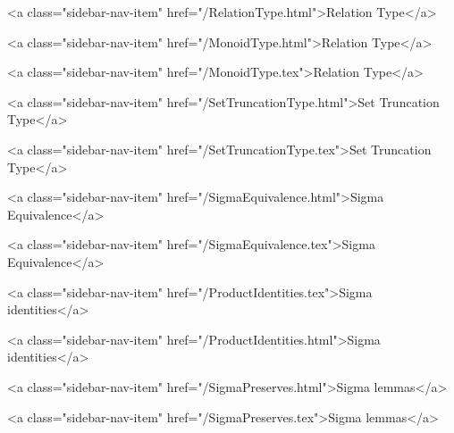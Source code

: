       
    
      
        
          <a class="sidebar-nav-item" href="/RelationType.html">Relation Type</a>
        
      
    
      
        
          <a class="sidebar-nav-item" href="/MonoidType.html">Relation Type</a>
        
      
    
      
        
          <a class="sidebar-nav-item" href="/MonoidType.tex">Relation Type</a>
        
      
    
      
        
          <a class="sidebar-nav-item" href="/SetTruncationType.html">Set Truncation Type</a>
        
      
    
      
        
          <a class="sidebar-nav-item" href="/SetTruncationType.tex">Set Truncation Type</a>
        
      
    
      
        
          <a class="sidebar-nav-item" href="/SigmaEquivalence.html">Sigma Equivalence</a>
        
      
    
      
        
          <a class="sidebar-nav-item" href="/SigmaEquivalence.tex">Sigma Equivalence</a>
        
      
    
      
        
          <a class="sidebar-nav-item" href="/ProductIdentities.tex">Sigma identities</a>
        
      
    
      
        
          <a class="sidebar-nav-item" href="/ProductIdentities.html">Sigma identities</a>
        
      
    
      
        
          <a class="sidebar-nav-item" href="/SigmaPreserves.html">Sigma lemmas</a>
        
      
    
      
        
          <a class="sidebar-nav-item" href="/SigmaPreserves.tex">Sigma lemmas</a>
        
